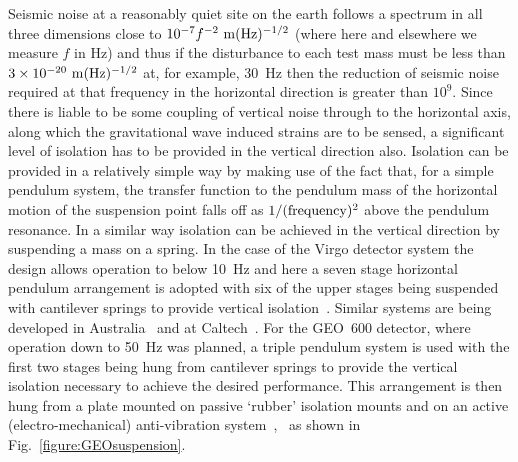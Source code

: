 \documentclass{article}
\begin{document}
Seismic noise at a reasonably quiet site on the earth follows a
spectrum in all three dimensions close to $10^{-7}f^{-2} {\rm \ m}(\rm
Hz)^{-1/2}$ (where here and elsewhere we measure $f$ in Hz) and thus
if the disturbance to each test mass must be less than $3 \times
10^{-20} {\rm \ m}(\rm Hz)^{-1/2}$ at, for example, 30~Hz then the
reduction of seismic noise required at that frequency in the
horizontal direction is greater than $10^{9}$. Since there is liable
to be some coupling of vertical noise through to the horizontal axis,
along which the gravitational wave induced strains are to be sensed, a
significant level of isolation has to be provided in the vertical
direction also. Isolation can be provided in a relatively simple way
by making use of the fact that, for a simple pendulum system, the
transfer function to the pendulum mass of the horizontal motion of the
suspension point falls off as $1/({\rm frequency})^2$ above the
pendulum resonance. In a similar way isolation can be achieved in the
vertical direction by suspending a mass on a spring. In the case of
the Virgo detector system the design allows operation to below 10~Hz
and here a seven stage horizontal pendulum arrangement is adopted with
six of the upper stages being suspended with cantilever springs to
provide vertical isolation~\cite{Braccini}. Similar systems are being
developed in Australia~\cite{Ju1} and at Caltech~\cite{DeSalvo}. For
the GEO~600 detector, where operation down to 50~Hz was planned, a
triple pendulum system is used with the first two stages being hung
from cantilever springs to provide the vertical isolation necessary to
achieve the desired performance. This arrangement is then hung from a
plate mounted on passive `rubber' isolation mounts and on an active
(electro-mechanical) anti-vibration
system~\cite{Plissi1},~\cite{Torrie} as shown in
Fig.~\ref{figure:GEOsuspension}.
\end{document}
